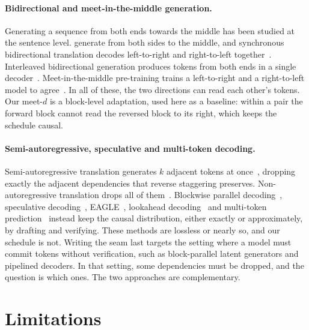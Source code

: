 \documentclass[11pt]{article}
\theoremstyle{definition}
\theoremstyle{remark}
\newcommand{\sch}[1]{\textsf{#1}}
\begin{document}
\paragraph{Bidirectional and meet-in-the-middle generation.}
Generating a sequence from both ends towards the middle has been studied at the sentence level.
\citet{zhou2019bothsides} generate from both sides to the middle, and synchronous bidirectional translation decodes left-to-right and right-to-left together~\citep{zhou2019sbnmt}.
Interleaved bidirectional generation produces tokens from both ends in a single decoder~\citep{zhang2020interleaved}.
Meet-in-the-middle pre-training trains a left-to-right and a right-to-left model to agree~\citep{nguyen2023meet}.
In all of these, the two directions can read each other's tokens.
Our \sch{meet-$d$} is a block-level adaptation, used here as a baseline: within a pair the forward block cannot read the reversed block to its right, which keeps the schedule causal.

\paragraph{Semi-autoregressive, speculative and multi-token decoding.}
Semi-autoregressive translation generates $k$ adjacent tokens at once~\citep{wang2018semi}, dropping exactly the adjacent dependencies that reverse staggering preserves.
Non-autoregressive translation drops all of them~\citep{gu2018nat}.
Blockwise parallel decoding~\citep{stern2018blockwise}, speculative decoding~\citep{leviathan2023speculative,chen2023speculative}, EAGLE~\citep{li2024eagle}, lookahead decoding~\citep{fu2024lookahead} and multi-token prediction~\citep{gloeckle2024mtp} instead keep the causal distribution, either exactly or approximately, by drafting and verifying.
These methods are lossless or nearly so, and our schedule is not.
Writing the seam last targets the setting where a model must commit tokens without verification, such as block-parallel latent generators and pipelined decoders.
In that setting, some dependencies must be dropped, and the question is which ones.
The two approaches are complementary.

\section{Limitations}
\label{sec:limitations}
\end{document}
